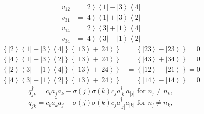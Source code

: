 \documentclass[aps,preprint]{revtex4}%
\begin{document}
\begin{align*}
v_{12}  & =\left\vert 2\right\rangle \left\langle 1\right\vert -\left\vert
3\right\rangle \left\langle 4\right\vert \\
v_{31}  & =\left\vert 4\right\rangle \left\langle 1\right\vert +\left\vert
3\right\rangle \left\langle 2\right\vert \\
v_{14}  & =\left\vert 2\right\rangle \left\langle 3\right\vert +\left\vert
1\right\rangle \left\langle 4\right\vert \\
v_{34}  & =\left\vert 4\right\rangle \left\langle 3\right\vert -\left\vert
1\right\rangle \left\langle 2\right\vert
\end{align*}%
\begin{align*}
\left\{  \left\vert 2\right\rangle \left\langle 1\right\vert -\left\vert
3\right\rangle \left\langle 4\right\vert \right\}  \left\{  \left\vert
13\right\rangle +\left\vert 24\right\rangle \right\}    & =\left\{  \left\vert
23\right\rangle -\left\vert 23\right\rangle \right\}  =0\\
\left\{  \left\vert 4\right\rangle \left\langle 1\right\vert +\left\vert
3\right\rangle \left\langle 2\right\vert \right\}  \left\{  \left\vert
13\right\rangle +\left\vert 24\right\rangle \right\}    & =\left\{  \left\vert
43\right\rangle +\left\vert 34\right\rangle \right\}  =0\\
\left\{  \left\vert 2\right\rangle \left\langle 3\right\vert +\left\vert
1\right\rangle \left\langle 4\right\vert \right\}  \left\{  \left\vert
13\right\rangle +\left\vert 24\right\rangle \right\}    & =\left\{  \left\vert
12\right\rangle -\left\vert 21\right\rangle \right\}  =0\\
\left\{  \left\vert 4\right\rangle \left\langle 3\right\vert -\left\vert
1\right\rangle \left\langle 2\right\vert \right\}  \left\{  \left\vert
13\right\rangle +\left\vert 24\right\rangle \right\}    & =\left\{  \left\vert
14\right\rangle -\left\vert 14\right\rangle \right\}  =0
\end{align*}%
\begin{equation}
q_{jk}^{\dagger}=c_{k}a_{j}^{\dagger}a_{k}-\sigma\left(  j\right)
\sigma\left(  k\right)  c_{j}a_{\left\vert k\right\vert }^{\dagger
}a_{\left\vert j\right\vert }\text{ for }n_{j}\neq n_{k},
\end{equation}%
\begin{equation}
q_{jk}=c_{k}a_{k}^{\dagger}a_{j}-\sigma\left(  j\right)  \sigma\left(
k\right)  c_{j}a_{\left\vert j\right\vert }^{\dagger}a_{\left\vert
k\right\vert }\text{ for }n_{j}\neq n_{k},
\end{equation}%
\end{document}
